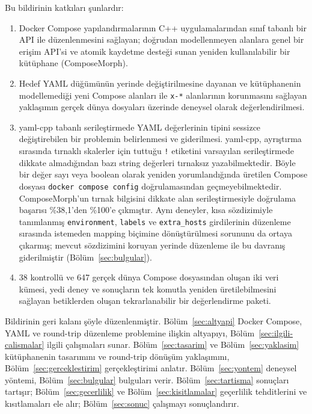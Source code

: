 \documentclass[conference]{IEEEtran}
\begin{document}
Bu bildirinin katkıları şunlardır:
\begin{enumerate}
  \item Docker Compose yapılandırmalarının C++ uygulamalarından sınıf
    tabanlı bir API ile düzenlenmesini sağlayan; doğrudan modellenmeyen
    alanlara genel bir erişim API'si ve atomik kaydetme desteği sunan yeniden
    kullanılabilir bir kütüphane (ComposeMorph).
  \item Hedef YAML düğümünün yerinde değiştirilmesine dayanan ve kütüphanenin
    modellemediği yeni Compose alanları ile \texttt{x-*} alanlarının
    korunmasını sağlayan yaklaşımın gerçek dünya dosyaları üzerinde
    deneysel olarak değerlendirilmesi.
  \item yaml-cpp tabanlı serileştirmede YAML değerlerinin tipini sessizce
    değiştirebilen bir problemin belirlenmesi ve giderilmesi. yaml-cpp,
    ayrıştırma sırasında tırnaklı skalerler için tuttuğu \texttt{!}
    etiketini varsayılan serileştirmede dikkate almadığından bazı string
    değerleri tırnaksız yazabilmektedir. Böyle bir değer sayı veya boolean
    olarak yeniden yorumlandığında üretilen Compose dosyası
    \texttt{docker compose config} doğrulamasından geçmeyebilmektedir.
    ComposeMorph'un tırnak bilgisini dikkate alan serileştirmesiyle doğrulama
    başarısı \%38,1'den \%100'e çıkmıştır. Aynı deneyler, kısa sözdizimiyle
    tanımlanmış \texttt{environment}, \texttt{labels} ve
    \texttt{extra\_hosts} girdilerinin düzenleme sırasında istemeden mapping
    biçimine dönüştürülmesi sorununu da ortaya çıkarmış; mevcut sözdizimini
    koruyan yerinde düzenleme ile bu davranış giderilmiştir
    (Bölüm~\ref{sec:bulgular}).
  \item 38 kontrollü ve 647 gerçek dünya Compose dosyasından oluşan iki veri
    kümesi, yedi deney ve sonuçların tek komutla yeniden üretilebilmesini
    sağlayan betiklerden oluşan tekrarlanabilir bir değerlendirme paketi.
\end{enumerate}

Bildirinin geri kalanı şöyle düzenlenmiştir. Bölüm~\ref{sec:altyapi} Docker
Compose, YAML ve round-trip düzenleme problemine ilişkin altyapıyı,
Bölüm~\ref{sec:ilgili-calismalar} ilgili çalışmaları sunar.
Bölüm~\ref{sec:tasarim} ve Bölüm~\ref{sec:yaklasim} kütüphanenin tasarımını
ve round-trip dönüşüm yaklaşımını, Bölüm~\ref{sec:gerceklestirim}
gerçekleştirimi anlatır. Bölüm~\ref{sec:yontem} deneysel yöntemi,
Bölüm~\ref{sec:bulgular} bulguları verir. Bölüm~\ref{sec:tartisma} sonuçları
tartışır; Bölüm~\ref{sec:gecerlilik} ve Bölüm~\ref{sec:kisitlamalar}
geçerlilik tehditlerini ve kısıtlamaları ele alır; Bölüm~\ref{sec:sonuc}
çalışmayı sonuçlandırır.
\end{document}
